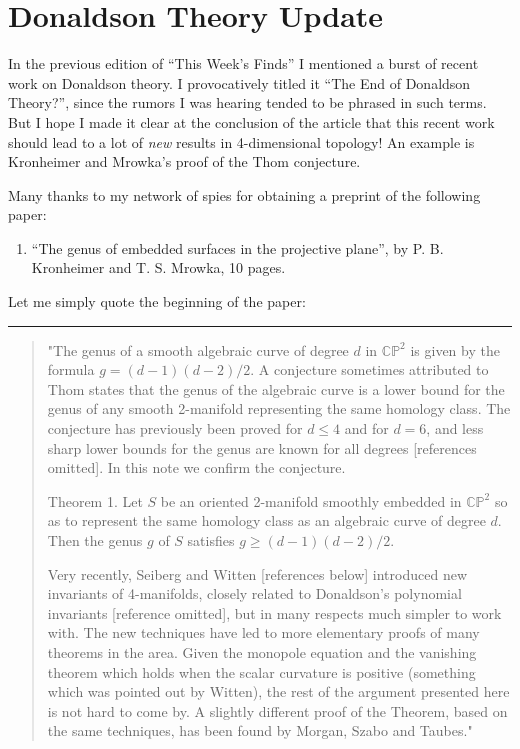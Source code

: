 \documentclass{article}
\def\tightlist{}
\begin{document}
\hypertarget{donaldson-theory-update}{%
\section{Donaldson Theory Update}\label{donaldson-theory-update}}

In the previous edition of ``This Week's Finds'' I mentioned a burst of
recent work on Donaldson theory. I provocatively titled it ``The End of
Donaldson Theory?'', since the rumors I was hearing tended to be phrased
in such terms. But I hope I made it clear at the conclusion of the
article that this recent work should lead to a lot of \emph{new} results
in 4-dimensional topology! An example is Kronheimer and Mrowka's proof
of the Thom conjecture.

Many thanks to my network of spies for obtaining a preprint of the
following paper:

\begin{enumerate}
\def\labelenumi{\arabic{enumi})}
\tightlist
\item
  ``The genus of embedded surfaces in the projective plane'', by P. B.
  Kronheimer and T. S. Mrowka, 10 pages.
\end{enumerate}

Let me simply quote the beginning of the paper:

\begin{center}\rule{0.5\linewidth}{0.5pt}\end{center}

\begin{quote}
"The genus of a smooth algebraic curve of degree \(d\) in
\(\mathbb{CP}^2\) is given by the formula \(g = (d-1)(d-2)/2\). A
conjecture sometimes attributed to Thom states that the genus of the
algebraic curve is a lower bound for the genus of any smooth 2-manifold
representing the same homology class. The conjecture has previously been
proved for \(d \leqslant 4\) and for \(d = 6\), and less sharp lower
bounds for the genus are known for all degrees {[}references omitted{]}.
In this note we confirm the conjecture.

Theorem 1. Let \(S\) be an oriented 2-manifold smoothly embedded in
\(\mathbb{CP}^2\) so as to represent the same homology class as an
algebraic curve of degree \(d\). Then the genus \(g\) of \(S\) satisfies
\(g \geqslant (d-1)(d-2)/2\).

Very recently, Seiberg and Witten {[}references below{]} introduced new
invariants of 4-manifolds, closely related to Donaldson's polynomial
invariants {[}reference omitted{]}, but in many respects much simpler to
work with. The new techniques have led to more elementary proofs of many
theorems in the area. Given the monopole equation and the vanishing
theorem which holds when the scalar curvature is positive (something
which was pointed out by Witten), the rest of the argument presented
here is not hard to come by. A slightly different proof of the Theorem,
based on the same techniques, has been found by Morgan, Szabo and
Taubes."
\end{quote}
\end{document}
